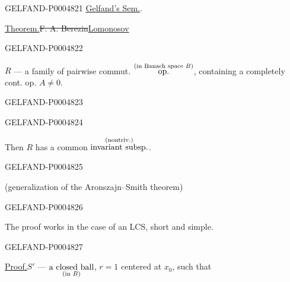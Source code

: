 \begin{GelfandAdjacentEvidence}{GELFAND-P000482}{1}
\qquad\uline{Gelfand’s Sem.}.

\uline{Theorem.}\enspace\sout{F. A. Berezin}\qquad\uline{Lomonosov}
\end{GelfandAdjacentEvidence}
\begin{GelfandAdjacentEvidence}{GELFAND-P000482}{2}


$R$ — a family of pairwise commut.
$\overset{\text{\scriptsize (in Banach space $B$)}}{\text{op.}}$,
containing a completely cont. op. $A\ne0$.
\end{GelfandAdjacentEvidence}
\begin{GelfandAdjacentEvidence}{GELFAND-P000482}{3}

\end{GelfandAdjacentEvidence}
\begin{GelfandAdjacentEvidence}{GELFAND-P000482}{4}


Then $R$ has a common
$\overset{\text{\scriptsize (nontriv.)}}{\text{invariant subsp.}}$.
\end{GelfandAdjacentEvidence}
\begin{GelfandAdjacentEvidence}{GELFAND-P000482}{5}


(generalization of the Aronszajn–Smith theorem)
\end{GelfandAdjacentEvidence}
\begin{GelfandAdjacentEvidence}{GELFAND-P000482}{6}


The proof works in the case of an LCS, short and simple.
\end{GelfandAdjacentEvidence}
\begin{GelfandAdjacentEvidence}{GELFAND-P000482}{7}


\uline{Proof.}\quad $S'$ —
$\underset{\text{\scriptsize (in $B$)}}{\text{a closed ball}}$,
$r=1$ centered at $x_0$, such that
\end{GelfandAdjacentEvidence}
